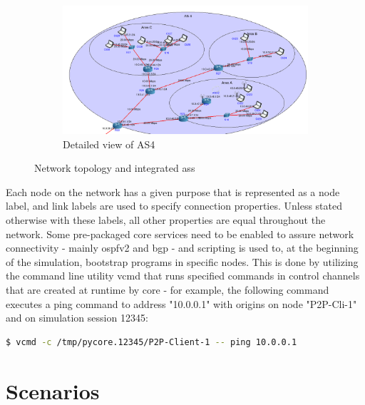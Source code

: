     \begin{figure} \ContinuedFloat
    \begin{subfigure}[t]{\textwidth}
    \centering
    \includegraphics[scale=0.5]{img/topology-experiments-AS4.png}
    \caption{Detailed view of AS4}    
    \label{fig:exp-as4}
    \end{subfigure}

    \caption{Network topology and integrated \glspl{as}}
    \label{fig:exp-topology}
    \end{figure}


    Each node on the network has a given purpose that is represented as a node label, and link labels are used to specify connection properties.
    Unless stated otherwise with these labels, all other properties are equal throughout the network.
    Some pre-packaged \gls{core} services need to be enabled to assure network connectivity - mainly \gls{ospfv2} and \gls{bgp} - and scripting is used to, at the beginning of the simulation, bootstrap programs in specific nodes.
    This is done by utilizing the command line utility vcmd that runs specified commands in control channels that are created at runtime by \gls{core} - for example, the following command executes a ping command to address "10.0.0.1" with origins on node "P2P-Cli-1" and on simulation session 12345:

    \begin{center}
    \begin{lstlisting}[caption=Execution of an example command through the control channel of a given node, language=bash]
$ vcmd -c /tmp/pycore.12345/P2P-Client-1 -- ping 10.0.0.1
    \end{lstlisting}
    \end{center}

\section{Scenarios}

